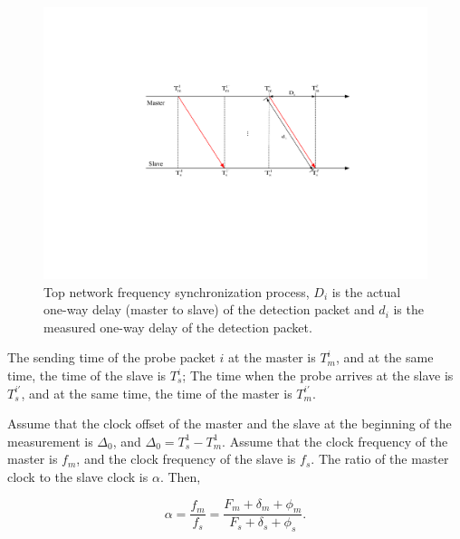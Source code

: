 \documentclass[conference]{IEEEtran}
\begin{document}
\begin{figure}[htbp]
	\centerline{\includegraphics[scale=0.5]{fig3.eps}}
	\caption{Top network frequency synchronization process, $D_i$ is the actual one-way delay (master to slave) of the detection packet and $d_i$ is the measured one-way delay of the detection packet.}
	\label{fig3}
\end{figure}

The sending time of the probe packet $i$ at the master is $T_m^i$, and at the same time, the time of the slave is $T_s^i$; The time when the probe arrives at the slave is $T_s^{i'}$, and at the same time, the time of the master is $T_m^{i'}$.

Assume that the clock offset of the master and the slave at the beginning of the measurement is $\Delta_0$, and $\Delta_0 = T_s^1 - T_m^1$. Assume that the clock frequency of the master is $f_m$, and the clock frequency of the slave is $f_s$. The ratio of the master clock to the slave clock is $\alpha$. Then,



\begin{equation}
\alpha = \frac{{{f_m}}}{{{f_s}}} = \frac{F_m+\delta_m+\phi_m}{F_s+\delta_s+\phi_s}. \label {eq4}
\end{equation}
\end{document}
